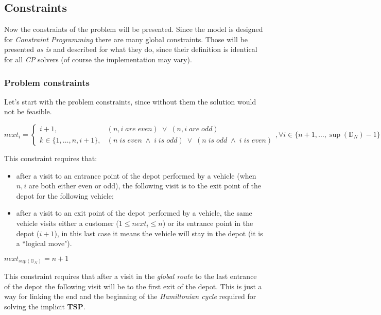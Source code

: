 \documentclass[../main.tex]{subfiles}
\begin{document}
\subsection{Constraints}
Now the constraints of the problem will be presented. Since the model is designed for \textit{Constraint Programming} there are many global constraints.
Those will be presented \textit{as is} and described for what they do, since their definition is identical for all \textit{CP} solvers (of course the implementation may vary).
\subsubsection{Problem constraints}
Let's start with the problem constraints, since without them the solution would not be feasible.\\
\begin{center} %
    \begin{math}
        next_i =
        \begin{cases}
            i+1, & (\text{$n, i$} \; are \; even) \; \vee \; (\text{$n, i$} \; are \; odd)\\
            \text{$k \in\{1, \dots, n, i+1\}$}, & (\text{$n$} \; is \; even \; \wedge \; \text{$i$} \; is \; odd ) \; \vee \; (\text{$n$} \; is \; odd \; \wedge \; \text{$i$} \; is \; even )
        \end{cases},
        \forall i \in \{n+1,\dots,\sup{}(\mathbb{D}_N) - 1\}
    \end{math}
\end{center}
This constraint requires that:
\begin{itemize}
    \item after a visit to an entrance point of the depot performed by a vehicle (when $n, i$ are both either even or odd), the following visit is to the exit point of the depot for the following vehicle;
    \item after a visit to an exit point of the depot performed by a vehicle, the same vehicle visits either a customer ($1 \leq next_i \leq n$) or its entrance point in the depot ($i+1$), in this last case it means the vehicle will stay in the depot (it is a ``logical move").
\end{itemize}

\begin{center} %
    \begin{math}
        next_{sup(\mathbb{D}_N)} = n+1
    \end{math}
\end{center}
This constraint requires that after a visit in the \textit{global route} to the last entrance of the depot the following visit will be to the first exit of the depot. This is just a way for linking the end and the beginning of the \textit{Hamiltonian cycle} required for solving the implicit \textbf{TSP}.
\end{document}
